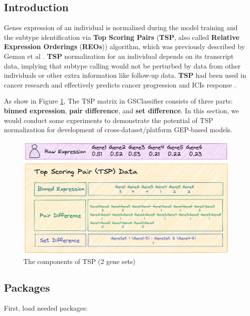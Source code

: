 \documentclass[
  12pt,
]{book}
\begin{document}
\hypertarget{tsp-intro}{%
\subsection{Introduction}\label{tsp-intro}}

Genes expression of an individual is normalized during the model training and the subtype identification via \textbf{Top Scoring Pairs} (\textbf{TSP}, also called \textbf{Relative Expression Orderings} (\textbf{REOs})) algorithm, which was previously described by Geman et al \citep{RN267}. \textbf{TSP} normalization for an individual depends on its transcript data, implying that subtype calling would not be perturbed by data from other individuals or other extra information like follow-up data. \textbf{TSP} had been used in cancer research and effectively predicts cancer progression and ICIs response \citep{RN265, RN266, RN261}.

As show in Figure \ref{fig:tsp}, The TSP matrix in GSClassifier consists of three parts: \textbf{binned expression}, \textbf{pair difference}, and \textbf{set difference}. In this section, we would conduct some experiments to demonstrate the potential of TSP normalization for development of cross-dataset/platform GEP-based models.

\begin{figure}

{\centering \includegraphics[width=0.85\linewidth]{./fig/TSP} 

}

\caption{The components of TSP (2 gene sets)}\label{fig:tsp}
\end{figure}

\hypertarget{packages}{%
\subsection{Packages}\label{packages}}

First, load needed packages:
\end{document}
